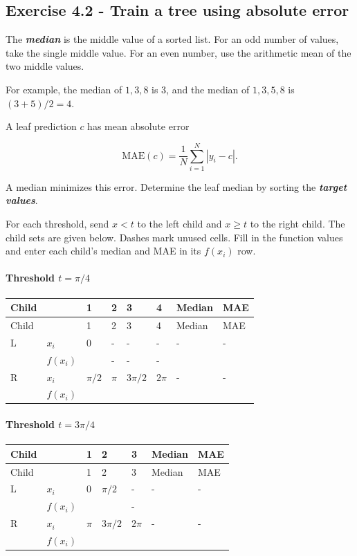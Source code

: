 \documentclass[10pt]{article}
\begin{document}
\subsection*{Exercise 4.2 - Train a tree using absolute error}
The \textbf{\textit{median}} is the middle value of a sorted list. For an odd number of values, take the single middle value. For an even number, use the arithmetic mean of the two middle values.

For example, the median of $1,3,8$ is $3$, and the median of $1,3,5,8$ is $(3+5)/2=4$.

A leaf prediction $c$ has mean absolute error

\[
\mathrm{MAE}(c)=\frac1N\sum_{i=1}^{N}|y_i-c|.
\]

A median minimizes this error. Determine the leaf median by sorting the \textbf{\textit{target values}}.

For each threshold, send $x<t$ to the left child and $x\geq t$ to the right child. The child sets are given below. Dashes mark unused cells. Fill in the function values and enter each child's median and MAE in its $f(x_i)$ row.

\paragraph*{Threshold $t=\pi/4$}
\begingroup
\small
\setlength{\tabcolsep}{4pt}
\begin{longtable}{l|l|l|l|l|l|l|l}
Child &  & 1 & 2 & 3 & 4 & Median & MAE \\
\hline
\endfirsthead
Child &  & 1 & 2 & 3 & 4 & Median & MAE \\
\hline
\endhead
L & $x_i$ & $0$ & - & - & - & - & - \\[3pt]
 & $f(x_i)$ & $\phantom{0}$ & - & - & - & $\phantom{0}$ & $\phantom{0}$ \\[3pt]
R & $x_i$ & $\pi/2$ & $\pi$ & $3\pi/2$ & $2\pi$ & - & - \\[3pt]
 & $f(x_i)$ & $\phantom{0}$ & $\phantom{0}$ & $\phantom{0}$ & $\phantom{0}$ & $\phantom{0}$ & $\phantom{0}$ \\[3pt]
\end{longtable}
\endgroup
\paragraph*{Threshold $t=3\pi/4$}
\begingroup
\small
\setlength{\tabcolsep}{4pt}
\begin{longtable}{l|l|l|l|l|l|l}
Child &  & 1 & 2 & 3 & Median & MAE \\
\hline
\endfirsthead
Child &  & 1 & 2 & 3 & Median & MAE \\
\hline
\endhead
L & $x_i$ & $0$ & $\pi/2$ & - & - & - \\[3pt]
 & $f(x_i)$ & $\phantom{0}$ & $\phantom{0}$ & - & $\phantom{0}$ & $\phantom{0}$ \\[3pt]
R & $x_i$ & $\pi$ & $3\pi/2$ & $2\pi$ & - & - \\[3pt]
 & $f(x_i)$ & $\phantom{0}$ & $\phantom{0}$ & $\phantom{0}$ & $\phantom{0}$ & $\phantom{0}$ \\[3pt]
\end{longtable}
\endgroup
\end{document}
